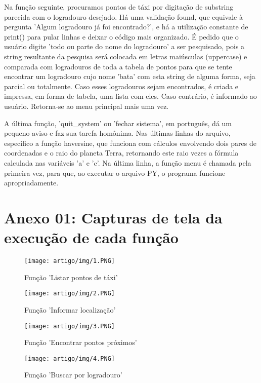 Na função seguinte, procuramos pontos de táxi por digitação de substring parecida com o logradouro desejado. Há uma validação found, que equivale à pergunta 'Algum logradouro já foi encontrado?', e há a utilização constante de print() para pular linhas e deixar o código mais organizado. É pedido que o usuário digite 'todo ou parte do nome do logradouro' a ser pesquisado, pois a string resultante da pesquisa será colocada em letras maiúsculas (uppercase) e comparada com logradouros de toda a tabela de pontos para que se tente encontrar um logradouro cujo nome 'bata' com esta string de alguma forma, seja parcial ou totalmente. Caso esses logradouros sejam encontrados, é criada e impressa, em forma de tabela, uma lista com eles. Caso contrário, é informado ao usuário. Retorna-se ao menu principal mais uma vez.

A última função, 'quit\_system' ou 'fechar sistema', em português, dá um pequeno aviso e faz sua tarefa homônima. Nas últimas linhas do arquivo, especifico a função haversine, que funciona com cálculos envolvendo dois pares de coordenadas e o raio do planeta Terra, retornando este raio vezes a fórmula calculada nas variáveis 'a' e 'c'. Na última linha, a função menu é chamada pela primeira vez, para que, ao executar o arquivo PY, o programa funcione apropriadamente.

\newpage
\section*{Anexo 01: Capturas de tela da execução de cada função}

\begin{figure}[!h]
    \centering
    \texttt{[image: artigo/img/1.PNG]}
    \caption{Função 'Listar pontos de táxi'}
    \label{fig:my_label}
\end{figure}

\begin{figure}[!h]
    \centering
    \texttt{[image: artigo/img/2.PNG]}
    \caption{Função 'Informar localização'}
    \label{fig:my_label}
\end{figure}

\begin{figure}[!h]
    \centering
    \texttt{[image: artigo/img/3.PNG]}
    \caption{Função 'Encontrar pontos próximos'}
    \label{fig:my_label}
\end{figure}

\begin{figure}[!h]
    \centering
    \texttt{[image: artigo/img/4.PNG]}
    \caption{Função 'Buscar por logradouro'}
    \label{fig:my_label}
\end{figure}

